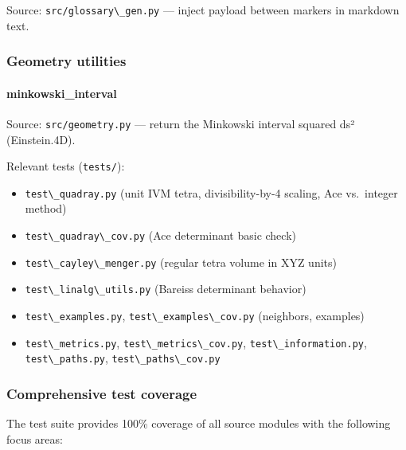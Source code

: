 \documentclass[
  10pt,
]{article}
\newcommand{\passthrough}[1]{#1}
\providecommand{\tightlist}{%
  \setlength{\itemsep}{0pt}\setlength{\parskip}{0pt}}
\renewcommand{\texttt}[1]{%
    \colorbox{codebg}{\color{codefg}\ttfamily #1}%
}
\begin{document}
Source: \passthrough{\lstinline!src/glossary\_gen.py!} --- inject
payload between markers in markdown text.

\hypertarget{code:geometry}{%
\subsubsection{Geometry utilities}\label{code:geometry}}

\hypertarget{code:minkowski_interval}{%
\paragraph{\texorpdfstring{\texttt{minkowski\_interval}}{minkowski\_interval}}\label{code:minkowski_interval}}

Source: \passthrough{\lstinline!src/geometry.py!} --- return the
Minkowski interval squared ds² (Einstein.4D).

Relevant tests (\passthrough{\lstinline!tests/!}):

\begin{itemize}
\tightlist
\item
  \passthrough{\lstinline!test\_quadray.py!} (unit IVM tetra,
  divisibility-by-4 scaling, Ace vs.~integer method)
\item
  \passthrough{\lstinline!test\_quadray\_cov.py!} (Ace determinant basic
  check)
\item
  \passthrough{\lstinline!test\_cayley\_menger.py!} (regular tetra
  volume in XYZ units)
\item
  \passthrough{\lstinline!test\_linalg\_utils.py!} (Bareiss determinant
  behavior)
\item
  \passthrough{\lstinline!test\_examples.py!},
  \passthrough{\lstinline!test\_examples\_cov.py!} (neighbors, examples)
\item
  \passthrough{\lstinline!test\_metrics.py!},
  \passthrough{\lstinline!test\_metrics\_cov.py!},
  \passthrough{\lstinline!test\_information.py!},
  \passthrough{\lstinline!test\_paths.py!},
  \passthrough{\lstinline!test\_paths\_cov.py!}
\end{itemize}

\hypertarget{comprehensive-test-coverage}{%
\subsubsection{Comprehensive test
coverage}\label{comprehensive-test-coverage}}

The test suite provides 100\% coverage of all source modules with the
following focus areas:
\end{document}
